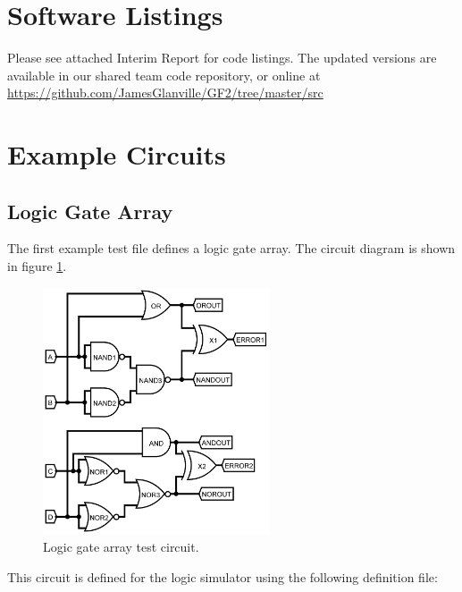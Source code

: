 \documentclass[a4paper,10pt]{article}  %
\begin{document}
\appendix

\section{Software Listings}
\label{sec:software-listings}

Please see attached Interim Report for code listings. The updated
versions are available in our shared team code repository, or online
at {\url{https://github.com/JamesGlanville/GF2/tree/master/src}}

\section{Example Circuits}
\label{sec:example-circuits}

\subsection{Logic Gate Array}

The first example test file defines a logic gate array. The circuit
diagram is shown in figure \ref{fig:testlgcct}.
\begin{figure}[!htb]
  \begin{center}
    \includegraphics[width=0.6\textwidth]{testgates_schem.png}
  \end{center}
  \caption{Logic gate array test circuit.}
  \label{fig:testlgcct}
\end{figure}
This circuit is defined for the logic simulator using the following
definition file:

\end{document}
